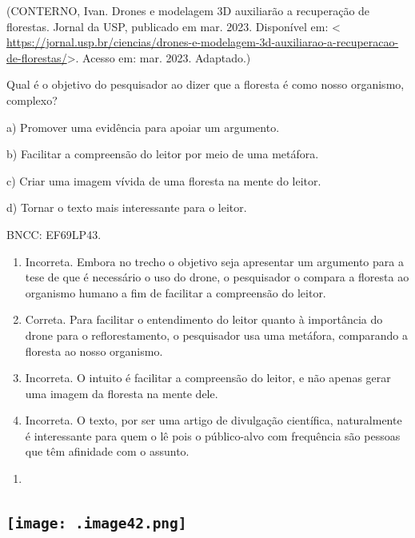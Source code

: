 {(CONTERNO, Ivan. Drones e modelagem 3D auxiliarão a recuperação de
florestas. Jornal da USP, publicado em mar. 2023. Disponível em:
\textless{}
\url{https://jornal.usp.br/ciencias/drones-e-modelagem-3d-auxiliarao-a-recuperacao-de-florestas/}\textgreater.
Acesso em: mar. 2023. Adaptado.)

Qual é o objetivo do pesquisador ao dizer que a floresta é como nosso
organismo, complexo?

a) Promover uma evidência para apoiar um argumento.

b) Facilitar a compreensão do leitor por meio de uma metáfora.

c) Criar uma imagem vívida de uma floresta na mente do leitor.

d) Tornar o texto mais interessante para o leitor.

BNCC: EF69LP43.

\begin{enumerate}
\def\labelenumi{\alph{enumi})}
\item
  Incorreta. Embora no trecho o objetivo seja apresentar um argumento
  para a tese de que é necessário o uso do drone, o pesquisador o
  compara a floresta ao organismo humano a fim de facilitar a
  compreensão do leitor.
\item
  Correta. Para facilitar o entendimento do leitor quanto à importância
  do drone para o reflorestamento, o pesquisador usa uma metáfora,
  comparando a floresta ao nosso organismo.
\item
  Incorreta. O intuito é facilitar a compreensão do leitor, e não apenas
  gerar uma imagem da floresta na mente dele.
\item
  Incorreta. O texto, por ser uma artigo de divulgação científica,
  naturalmente é interessante para quem o lê pois o público-alvo com
  frequência são pessoas que têm afinidade com o assunto.
\end{enumerate}

\begin{enumerate}
\def\labelenumi{\arabic{enumi}.}
\setcounter{enumi}{11}
\tightlist
\item
\end{enumerate}

\subsection{\texorpdfstring{\protect\texttt{[image: .image42.png]}}{Uma imagem contendo Desenho técnico Descrição gerada automaticamente}}

}
